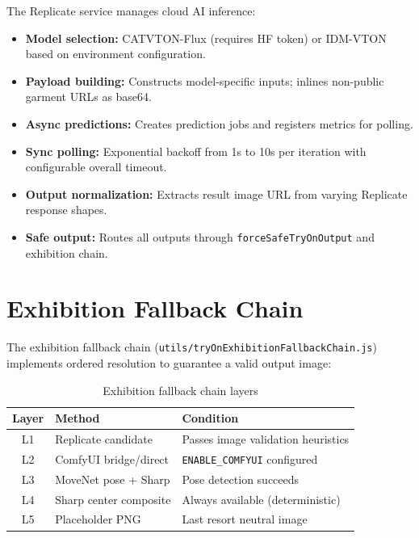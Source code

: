 The Replicate service manages cloud AI inference:

\begin{itemize}[leftmargin=*]
  \item \textbf{Model selection:} CATVTON-Flux (requires HF token) or IDM-VTON based on environment configuration.
  \item \textbf{Payload building:} Constructs model-specific inputs; inlines non-public garment URLs as base64.
  \item \textbf{Async predictions:} Creates prediction jobs and registers metrics for polling.
  \item \textbf{Sync polling:} Exponential backoff from 1s to 10s per iteration with configurable overall timeout.
  \item \textbf{Output normalization:} Extracts result image URL from varying Replicate response shapes.
  \item \textbf{Safe output:} Routes all outputs through \texttt{forceSafeTryOnOutput} and exhibition chain.
\end{itemize}

\section{Exhibition Fallback Chain}
\label{sec:fallback-chain}

The exhibition fallback chain (\texttt{utils/tryOnExhibitionFallbackChain.js}) implements ordered resolution to guarantee a valid output image:

\begin{table}[H]
  \centering
  \caption{Exhibition fallback chain layers}
  \label{tab:fallback-layers}
  \begin{tabular}{@{}clp{8cm}@{}}
    \toprule
    \textbf{Layer} & \textbf{Method} & \textbf{Condition} \\
    \midrule
    L1 & Replicate candidate & Passes image validation heuristics \\
    L2 & ComfyUI bridge/direct & \texttt{ENABLE\_COMFYUI} configured \\
    L3 & MoveNet pose + Sharp & Pose detection succeeds \\
    L4 & Sharp center composite & Always available (deterministic) \\
    L5 & Placeholder PNG & Last resort neutral image \\
    \bottomrule
  \end{tabular}
\end{table}

